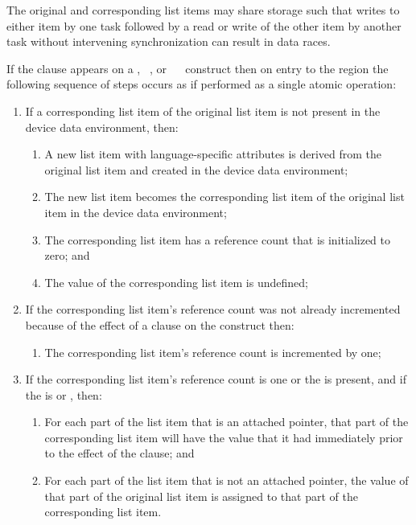 The original and corresponding list items may share storage such that writes to 
either item by one task followed by a read or write of the other item by another 
task without intervening synchronization can result in data races.

If the  clause appears on a , ~, 
or ~~ construct then on entry to the region 
the following sequence of steps occurs as if performed as a single atomic operation:

\begin{enumerate}
\item If a corresponding list item of the original list item is not present 
      in the device data environment, then:

\begin{enumerate}
\item A new list item with language-specific attributes is derived from the 
      original list item and created in the device data environment;
\item The new list item becomes the corresponding list item of the original 
      list item in the device data environment;
\item The corresponding list item has a reference count that is initialized 
      to zero; and
\item The value of the corresponding list item is undefined;
\end{enumerate}

\item If the corresponding list item's reference count was not already incremented 
      because of the effect of a  clause on the construct then:

\begin{enumerate}
\item The corresponding list item's reference count is incremented by one;
\end{enumerate}

\item If the corresponding list item's reference count is one or the 
        is present, and if the 
       is  or , then:

\begin{enumerate}
\item For each part of the list item that is an attached pointer, that 
      part of the corresponding list item will have the value that
      it had immediately prior to the effect of the  clause; and
\item For each part of the list item that is not an attached pointer, 
      the value of that part of the original list item is assigned to 
      that part of the corresponding list item.
\end{enumerate}
\end{enumerate}


